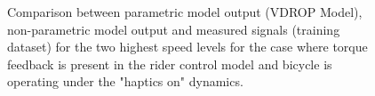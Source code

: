  \begin{figure}
    \centering
    \begin{subfigure}[b]{\textwidth}
        \centering
        \caption{}
        \label{fig:ropm_fit3}
    \end{subfigure}
    \begin{subfigure}[b]{\textwidth}
        \centering
        \caption{}
        \label{fig:ropm_fit4}
    \end{subfigure}
    
    \caption{Comparison between parametric model output (VDROP Model), non-parametric model output and  measured signals (training dataset) for the two highest speed levels for the case where torque feedback is present in the rider control model and bicycle is operating under the "haptics on" dynamics.}
    \label{fig:ropm_fitB}
 \end{figure}

